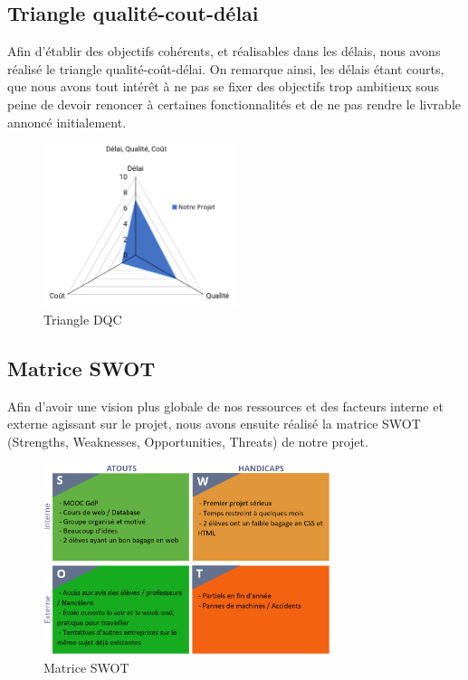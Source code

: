 \documentclass[french,a4paper]{article}
\begin{document}
\subsection{Triangle qualité-cout-délai}
Afin d’établir des objectifs cohérents, et réalisables dans les délais, nous avons réalisé le triangle qualité-coût-délai. On remarque ainsi, les délais étant courts, que nous avons tout intérêt à ne pas se fixer des objectifs trop ambitieux sous peine de devoir renoncer à certaines fonctionnalités et de ne pas rendre le livrable annoncé initialement.

\begin{figure}[H]
    \centering
    \includegraphics[width=0.5\textwidth]{img/triangle_QCD.png}
    \caption{Triangle DQC}
\end{figure}

\subsection{Matrice SWOT}
Afin d’avoir une vision plus globale de nos ressources et des facteurs interne et externe agissant sur le projet, nous avons ensuite réalisé la matrice SWOT (Strengths, Weaknesses, Opportunities, Threats) de notre projet.

\begin{figure}[H]
    \centering
    \includegraphics[width=0.75\textwidth]{img/SWOT.png}
    \caption{Matrice SWOT}
\end{figure} 
\end{document}

